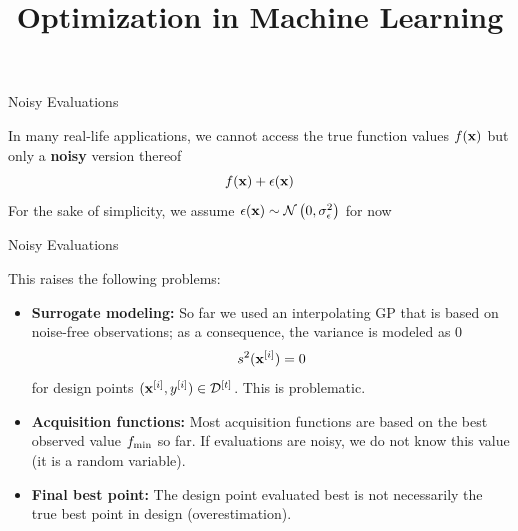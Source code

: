 \documentclass[11pt,compress,t,notes=noshow, xcolor=table]{beamer}
\title{Optimization in Machine Learning}
\date{}
\begin{document}


\begin{frame}{Noisy Evaluations}

In many real-life applications, we cannot access the true function values $f(\mathbf{x})$ but only a \textbf{noisy} version thereof
$$f(\mathbf{x}) + \epsilon(\mathbf{x})$$
For the sake of simplicity, we assume $\epsilon(\mathbf{x}) \sim \mathcal{N}\left(0, \sigma_{\epsilon}^{2}\right)$ for now\\
\vfill
{}

\end{frame}

\begin{frame}{Noisy Evaluations} 

This raises the following problems: 

\begin{itemize}
  \item \textbf{Surrogate modeling:} So far we used an interpolating GP that is based on noise-free observations; as a consequence, the variance is modeled as $0$
  $$
    s^2(\mathbf{x}^{[i]}) = 0
  $$
  for design points $(\mathbf{x}^{[i]}, y^{[i]}) \in \mathcal{D}^{[t]}$. This is problematic. 
  \item \textbf{Acquisition functions:} Most acquisition functions are based on the best observed value $f_{\min}$ so far. If evaluations are noisy, we do not know this value (it is a random variable).
  \item \textbf{Final best point:} The design point evaluated best is not necessarily the true best point in design (overestimation). 
\end{itemize}


\end{frame}
\end{document}
